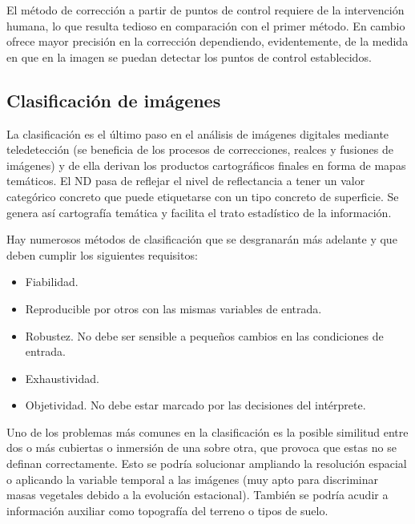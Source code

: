 El método de corrección a partir de puntos de control requiere de la intervención humana, lo que resulta tedioso en comparación con el primer método. En cambio ofrece mayor precisión en la corrección dependiendo, evidentemente, de la medida en que en la imagen se puedan detectar los puntos de control establecidos.\Sep

\subsection{Clasificación de imágenes}
La clasificación es el último paso en el análisis de imágenes digitales mediante teledetección (se beneficia de los procesos de correcciones, realces y fusiones de imágenes) y de ella derivan los productos cartográficos finales en forma de mapas temáticos. El \ac{ND} pasa de reflejar el nivel de reflectancia a tener un valor categórico concreto que puede etiquetarse con un tipo concreto de superficie. Se genera así cartografía temática y facilita el trato estadístico de la información.\Sep

Hay numerosos métodos de clasificación que se desgranarán más adelante y que deben cumplir los siguientes requisitos:

\begin{itemize}
	\item Fiabilidad.
	\item Reproducible por otros con las mismas variables de entrada.
	\item Robustez. No debe ser sensible a pequeños cambios en las condiciones de entrada.
	\item Exhaustividad.
	\item Objetividad. No debe estar marcado por las decisiones del intérprete.
\end{itemize}

Uno de los problemas más comunes en la clasificación es la posible similitud entre dos o más cubiertas o inmersión de una sobre otra, que provoca que estas no se definan correctamente. Esto se podría solucionar ampliando la resolución espacial o aplicando la variable temporal a las imágenes (muy apto para discriminar masas vegetales debido a la evolución estacional). También se podría acudir a información auxiliar como topografía del terreno o tipos de suelo.

